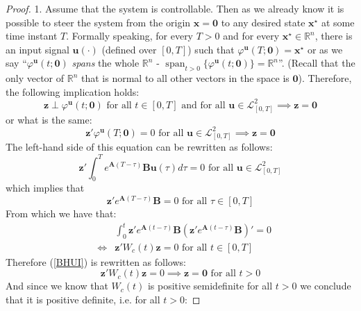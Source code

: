 \documentclass[a4paper,10pt,oneside]{book}
\begin{document}
\begin{proof}
 1. Assume that the system is controllable. Then as we already know it is possible to steer the system from the origin $\mathbf{x}=\mathbf{0}$ to any desired state $\mathbf{x}^\star$ at some time instant $T$. Formally speaking, for every $T>0$ and for every $\mathbf{x}^\star\in\mathbb{R}^n$, there is an input signal $\mathbf{u}(\cdot)$ (defined over $[0,T]$) such that $\varphi^{\mathbf{u}}(T;\mathbf{0})=\mathbf{x}^\star$ or as we say ``$\varphi^{\mathbf{u}}(t;\mathbf{0})$ \emph{spans} the whole $\mathbb{R}^n$ - $\operatorname{span}_{t>0}\{\varphi^{\mathbf{u}}(t;\mathbf{0})\}=\mathbb{R}^n$''. (Recall that the only vector of $\mathbb{R}^n$ that is normal to all other vectors in the space is $\mathbf{0}$). Therefore, the following implication holds:
\begin{equation}\label{BHUI}
 \mathbf{z}\perp\varphi^{\mathbf{u}}(t;\mathbf{0}) \text{ for all }t\in[0,T] \text{ and for all }\mathbf{u}\in\mathcal{L}^2_{[0,T]} \implies \mathbf{z}=\mathbf{0}
\end{equation}
or what is the same:
\begin{equation}
 \mathbf{z}'\varphi^{\mathbf{u}}(T;\mathbf{0})=0  \text{ for all }\mathbf{u}\in\mathcal{L}^2_{[0,T]}\implies \mathbf{z}=\mathbf{0}
\end{equation}
The left-hand side of this equation can be rewritten as follows:
\begin{equation}
 \mathbf{z}'\int_0^T e^{\mathbf{A}(T-\tau)}\mathbf{Bu}(\tau)d\tau=0  \text{ for all }\mathbf{u}\in\mathcal{L}^2_{[0,T]}
\end{equation}
which implies that 
\begin{equation}
 \mathbf{z}'e^{\mathbf{A}(T-\tau)}\mathbf{B}=0 \text{ for all } \tau\in[0,T]
\end{equation}
From which we have that:
\begin{eqnarray}
 &&\int_0^t \mathbf{z}'e^{\mathbf{A}(t-\tau)}\mathbf{B}\left( \mathbf{z}'e^{\mathbf{A}(t-\tau)}\mathbf{B} \right)'=0\\
&\Leftrightarrow& \mathbf{z}'W_c(t)\mathbf{z}=0 \text{ for all }t\in[0,T]
\end{eqnarray}
Therefore (\ref{BHUI}) is rewritten as follows:
\begin{equation}
 \mathbf{z}'W_c(t)\mathbf{z}=0 \implies \mathbf{z}=\mathbf{0} \text{ for all } t>0
\end{equation}
And since we know that $W_c(t)$ is positive semidefinite for all $t>0$ we conclude that it is positive definite, i.e. for all $t>0$:

\end{proof}
\end{document}
